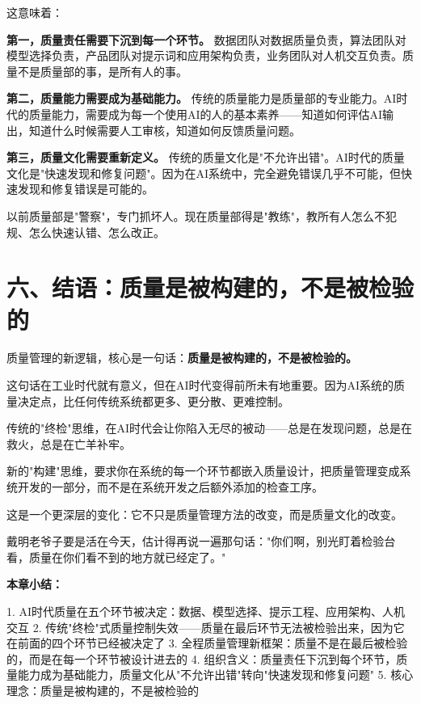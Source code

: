 这意味着：

\textbf{第一，质量责任需要下沉到每一个环节。} 数据团队对数据质量负责，算法团队对模型选择负责，产品团队对提示词和应用架构负责，业务团队对人机交互负责。质量不是质量部的事，是所有人的事。

\textbf{第二，质量能力需要成为基础能力。} 传统的质量能力是质量部的专业能力。AI时代的质量能力，需要成为每一个使用AI的人的基本素养——知道如何评估AI输出，知道什么时候需要人工审核，知道如何反馈质量问题。

\textbf{第三，质量文化需要重新定义。} 传统的质量文化是"不允许出错"。AI时代的质量文化是"快速发现和修复问题"。因为在AI系统中，完全避免错误几乎不可能，但快速发现和修复错误是可能的。

以前质量部是"警察"，专门抓坏人。现在质量部得是"教练"，教所有人怎么不犯规、怎么快速认错、怎么改正。

\section{六、结语：质量是被构建的，不是被检验的}


质量管理的新逻辑，核心是一句话：\textbf{质量是被构建的，不是被检验的。}

这句话在工业时代就有意义，但在AI时代变得前所未有地重要。因为AI系统的质量决定点，比任何传统系统都更多、更分散、更难控制。

传统的"终检"思维，在AI时代会让你陷入无尽的被动——总是在发现问题，总是在救火，总是在亡羊补牢。

新的"构建"思维，要求你在系统的每一个环节都嵌入质量设计，把质量管理变成系统开发的一部分，而不是在系统开发之后额外添加的检查工序。

这是一个更深层的变化：它不只是质量管理方法的改变，而是质量文化的改变。

戴明老爷子要是活在今天，估计得再说一遍那句话："你们啊，别光盯着检验台看，质量在你们看不到的地方就已经定了。"


\textbf{本章小结：}

1. AI时代质量在五个环节被决定：数据、模型选择、提示工程、应用架构、人机交互
2. 传统"终检"式质量控制失效——质量在最后环节无法被检验出来，因为它在前面的四个环节已经被决定了
3. 全程质量管理新框架：质量不是在最后被检验的，而是在每一个环节被设计进去的
4. 组织含义：质量责任下沉到每个环节，质量能力成为基础能力，质量文化从"不允许出错"转向"快速发现和修复问题"
5. 核心理念：质量是被构建的，不是被检验的

